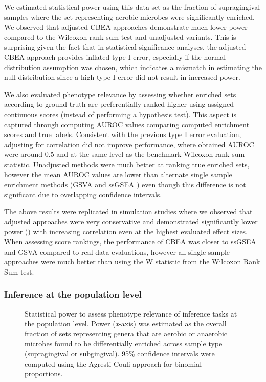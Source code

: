 We estimated statistical power using this data set as the fraction of supragingival samples where the set representing aerobic microbes were significantly enriched. We observed that adjusted CBEA approaches demonstrate much lower power compared to the Wilcoxon rank-sum test and unadjusted variants. This is surprising given the fact that in statistical significance analyses, the adjusted CBEA approach provides inflated type I error, especially if the normal distribution assumption was chosen, which indicates a mismatch in estimating the null distribution since a high type I error did not result in increased power. 

We also evaluated phenotype relevance by assessing whether enriched sets according to ground truth are preferentially ranked higher using assigned continuous scores (instead of performing a hypothesis test). This aspect is captured through computing AUROC values comparing computed enrichment scores and true labels. Consistent with the previous type I error evaluation, adjusting for correlation did not improve performance, where obtained AUROC were around 0.5 and at the same level as the benchmark Wilcoxon rank sum statistic. Unadjusted methods were much better at ranking true enriched sets, however the mean AUROC values are lower than alternate single sample enrichment methods (GSVA \cite{hanzelmann2013} and ssGSEA \cite{barbie2009}) even though this difference is not significant due to overlapping confidence intervals.  

The above results were replicated in simulation studies where we observed that adjusted approaches were very conservative and demonstrated significantly lower power () with increasing correlation even at the highest evaluated effect sizes. When assessing score rankings, the performance of CBEA was closer to ssGSEA and GSVA compared to real data evaluations, however all single sample approaches were much better than using the W statistic from the Wilcoxon Rank Sum test.   

\subsubsection{Inference at the population level}
\begin{figure}[!h]
    \centering
    \caption{Statistical power to assess phenotype relevance of inference tasks at the population level. Power (\emph{x}-axis) was estimated as the overall fraction of sets representing genera that are aerobic or anaerobic microbes found to be differentially enriched across sample type (supragingival or subgingival). 95\% confidence intervals were computed using the Agresti-Couli approach for binomial proportions.}  
    \label{fig:5}
\end{figure}

